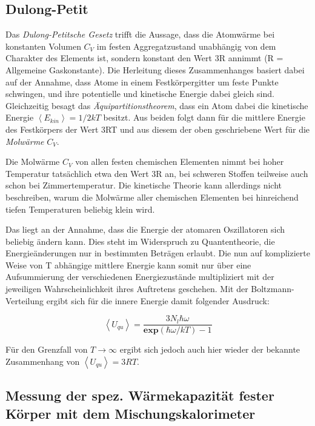 \subsection{Dulong-Petit}

Das \emph{Dulong-Petitsche Gesetz} trifft die Aussage, dass die Atomwärme bei konstanten
Volumen $C_V$ im festen Aggregatzustand unabhängig von dem Charakter des Elements
ist, sondern konstant den Wert 3R annimmt (R = Allgemeine Gaskonstante). Die
Herleitung dieses Zusammenhanges basiert dabei auf der Annahme, dass Atome in
einem Festkörpergitter um feste Punkte schwingen, und ihre potentielle und
kinetische Energie dabei gleich sind. Gleichzeitig besagt das
\emph{Äquipartitionstheorem}, dass ein Atom dabei die kinetische Energie
$ \left< E_{kin} \right> = 1/2 k T$ besitzt. Aus beiden folgt dann für die mittlere Energie
des Festkörpers der Wert 3RT und aus diesem der oben geschriebene Wert für die
\emph{Molwärme} $C_V$.

Die Molwärme $C_V$ von allen festen chemischen Elementen nimmt bei hoher
Temperatur tatsächlich etwa den Wert 3R an, bei schweren Stoffen teilweise
auch schon bei Zimmertemperatur. Die kinetische Theorie kann allerdings nicht
beschreiben, warum die Molwärme aller chemischen Elementen bei hinreichend tiefen
Temperaturen beliebig klein wird.

Das liegt an der Annahme, dass die Energie der atomaren Oszillatoren sich
beliebig ändern kann. Dies steht im Widerspruch zu Quantentheorie, die
Energieänderungen nur in bestimmten Beträgen erlaubt. Die nun auf
komplizierte Weise von T abhängige mittlere Energie kann somit nur über
eine Aufsummierung der verschiedenen Energiezustände multipliziert mit der
jeweiligen Wahrscheinlichkeit ihres Auftretens geschehen. Mit der
Boltzmann-Verteilung ergibt sich für die innere Energie damit folgender Ausdruck:

\begin{equation}
  \left< U_{qu} \right> = \frac{ 3 N_l \hbar \omega}{\textbf{exp} (\hbar \omega / kT) - 1}
\end{equation}

Für den Grenzfall von $ T \to \infty$ ergibt sich jedoch auch hier wieder der
bekannte Zusammenhang von $\left< U_{qu} \right> = 3RT$.

\subsection{Messung der spez. Wärmekapazität fester Körper mit dem Mischungskalorimeter}


